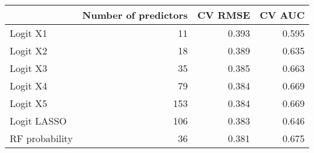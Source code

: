 
\begin{tabular}{lrrr}
\toprule
  & Number of predictors & CV RMSE & CV AUC\\
\midrule
Logit X1 & 11 & 0.393 & 0.595\\
Logit X2 & 18 & 0.389 & 0.635\\
Logit X3 & 35 & 0.385 & 0.663\\
Logit X4 & 79 & 0.384 & 0.669\\
Logit X5 & 153 & 0.384 & 0.669\\
Logit LASSO & 106 & 0.383 & 0.646\\
RF probability & 36 & 0.381 & 0.675\\
\bottomrule
\end{tabular}